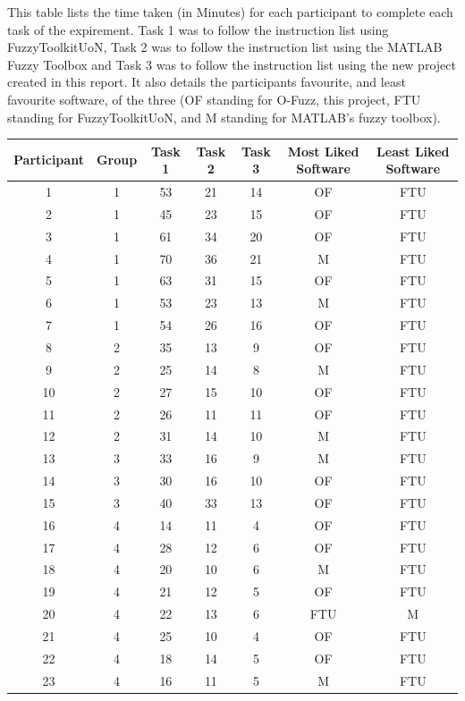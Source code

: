 \noindent 
This table lists the time taken (in Minutes) for each participant to complete each task of the expirement. Task 1 was to follow the instruction list using FuzzyToolkitUoN, Task 2 was to follow the instruction list using the MATLAB Fuzzy Toolbox and Task 3 was to follow the instruction list using the new project created in this report. It also details the participants favourite, and least favourite software, of the three (OF standing for O-Fuzz, this project, FTU standing for FuzzyToolkitUoN, and M standing for MATLAB's fuzzy toolbox).\ \\
\begin{changemargin}{-1cm}{-1cm}
\begin{tabular}{ccccccc}
\hline
Participant	&	Group	&	Task 1	&	Task 2	&	Task 3	&	Most Liked Software	&	Least Liked Software 	\\
\hline
1			&	1		&	53		&	21		&	14		&	OF					&	FTU						\\	
2			&	1		&	45		&	23		&	15		&	OF					&	FTU						\\
3			&	1		&	61		&	34		&	20		&	OF					&	FTU						\\	
4			&	1		&	70		&	36		&	21		&	M					&	FTU						\\	
5			&	1		&	63		&	31		&	15		&	OF					&	FTU						\\		
6			&	1		&	53		&	23		&	13		&	M					&	FTU						\\	
7			&	1		&	54		&	26		&	16		&	OF					&	FTU						\\	
8			&	2		&	35		&	13		&	9		&	OF					&	FTU						\\		
9			&	2		&	25		&	14		&	8		&	M					&	FTU						\\	
10			&	2		&	27		&	15		&	10		&	OF					&	FTU						\\			
11			&	2		&	26		&	11		&	11		&	OF					&	FTU						\\		
12			&	2		&	31		&	14		&	10		&	M					&	FTU						\\		
13			&	3		&	33		&	16		&	9		&	M					&	FTU						\\	
14			&	3		&	30		&	16		&	10		&	OF					&	FTU						\\			
15			&	3		&	40		&	33		&	13		&	OF					&	FTU						\\			
16			&	4		&	14		&	11		&	4 		&	OF					&	FTU						\\		
17			&	4		&	28		&	12		&	6 		&	OF					&	FTU						\\			
18			&	4		&	20		&	10		&	6 		&	M					&	FTU						\\	
19			&	4		&	21		&	12		&	5 		&	OF					&	FTU						\\			
20			&	4		&	22		&	13		&	6 		&	FTU					&	M 						\\			
21			&	4		&	25		&	10		&	4 		&	OF					&	FTU						\\		
22			&	4 		&	18		&	14		&	5 		&	OF					&	FTU						\\
23			&	4 		&	16		&	11		&	5 		&	M					&	FTU						\\
\hline
\end{tabular}			
\end{changemargin}
\newpage 
